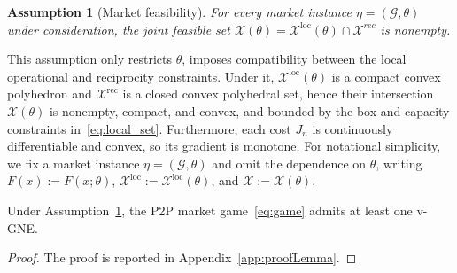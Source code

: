 \documentclass[final]{l4dc2026}
\newtheorem{assumption}{Assumption}
\begin{document}
\begin{assumption}[Market feasibility]\label{ass:game}
For every market instance $\eta=(\mathcal{G}, \theta)$ under consideration, the joint feasible set $\mathcal{X}(\theta) = \mathcal{X}^{\text{loc}}(\theta) \cap \mathcal{X}^{rec}$ is nonempty.
\end{assumption}

This assumption only restricts $\theta$, imposes compatibility
between the local operational and reciprocity
constraints.
Under it,
$\mathcal X^{\mathrm{\text{loc}}}(\theta)$ is a compact convex polyhedron and
$\mathcal X^{\mathrm{rec}}$ is a closed convex polyhedral set, hence their
intersection $\mathcal X(\theta)$ is nonempty, compact, and convex, and bounded by the box and capacity constraints in~\eqref{eq:local_set}.
Furthermore, each cost $J_n$ is continuously differentiable and convex, so its gradient is monotone. For notational simplicity, we fix a market instance $\eta=(\mathcal G,\theta) $ and omit the dependence on $\theta$, writing $F(x):=F(x;\theta)$, $\mathcal X^{\mathrm{\text{loc}}}:=\mathcal X^{\mathrm{\text{loc}}}(\theta)$, and $\mathcal X:=\mathcal X(\theta)$.

\begin{lemma}[Existence]\label{lem:existence} Under Assumption~\ref{ass:game}, the P2P market game~\eqref{eq:game} admits at least one v-GNE.
\end{lemma}


\begin{proof}
The proof is reported in Appendix~\ref{app:proofLemma}.
\end{proof}

\end{document}
